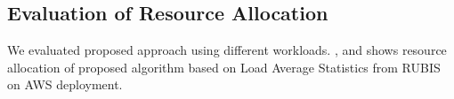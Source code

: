 \subsection{Evaluation of Resource Allocation}
We evaluated proposed approach using different workloads. \stratos , \label{reactive} and \label{proactive} shows resource allocation of proposed algorithm based on Load Average Statistics from RUBIS on AWS deployment.
